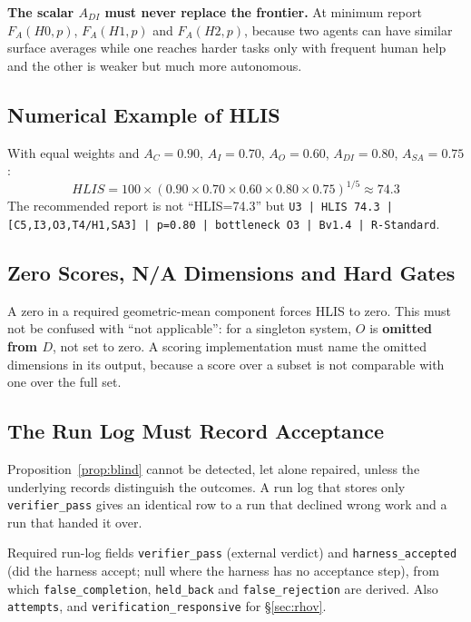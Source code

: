 \documentclass[11pt]{article}
\theoremstyle{definition}
\begin{document}
\textbf{The scalar $A_{DI}$ must never replace the frontier.} At minimum report $F_A(H0,p)$, $F_A(H1,p)$ and $F_A(H2,p)$, because two agents can have similar surface averages while one reaches harder tasks only with frequent human help and the other is weaker but much more autonomous.

\subsection{Numerical Example of HLIS}

With equal weights and $A_C=0.90$, $A_I=0.70$, $A_O=0.60$, $A_{DI}=0.80$, $A_{SA}=0.75$:
\begin{equation*}
HLIS = 100 \times (0.90 \times 0.70 \times 0.60 \times 0.80 \times 0.75)^{1/5} \approx 74.3
\end{equation*}
The recommended report is not ``HLIS=74.3'' but
\texttt{U3 | HLIS 74.3 | [C5,I3,O3,T4/H1,SA3] | p=0.80 | bottleneck O3 | Bv1.4 | R-Standard}.

\subsection{Zero Scores, N/A Dimensions and Hard Gates}

A zero in a required geometric-mean component forces HLIS to zero. This must not be confused with ``not applicable'': for a singleton system, $O$ is \textbf{omitted from $D$}, not set to zero. A scoring implementation must name the omitted dimensions in its output, because a score over a subset is not comparable with one over the full set.

\subsection{The Run Log Must Record Acceptance}\label{sec:runlog}

Proposition~\ref{prop:blind} cannot be detected, let alone repaired, unless the underlying records distinguish the outcomes. A run log that stores only \texttt{verifier\_pass} gives an identical row to a run that declined wrong work and a run that handed it over.

\begin{claimbox}{Required run-log fields}
\texttt{verifier\_pass} (external verdict) and \texttt{harness\_accepted} (did the harness accept; null where the harness has no acceptance step), from which \texttt{false\_completion}, \texttt{held\_back} and \texttt{false\_rejection} are derived. Also \texttt{attempts}, and \texttt{verification\_responsive} for \S\ref{sec:rhov}.
\end{claimbox}
\end{document}
